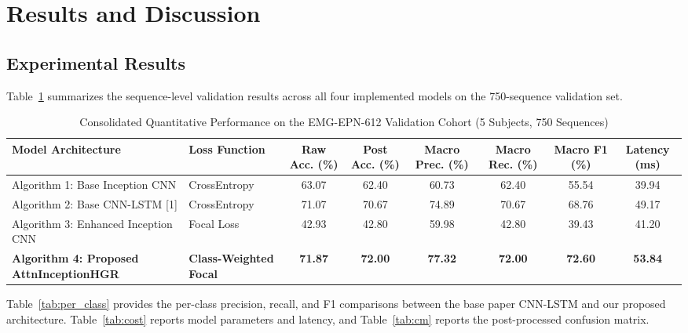 \documentclass[conference]{IEEEtran}
\begin{document}
\section{Results and Discussion}

\subsection{Experimental Results}
Table~\ref{tab:results} summarizes the sequence-level validation results across all four implemented models on the 750-sequence validation set.

\begin{table}[t]
\centering
\caption{Consolidated Quantitative Performance on the EMG-EPN-612 Validation Cohort (5 Subjects, 750 Sequences)}
\label{tab:results}
\begin{tabular}{llcccccc}
\toprule
\textbf{Model Architecture} & \textbf{Loss Function} & \textbf{Raw Acc. (\%)} & \textbf{Post Acc. (\%)} & \textbf{Macro Prec. (\%)} & \textbf{Macro Rec. (\%)} & \textbf{Macro F1 (\%)} & \textbf{Latency (ms)} \\
\midrule
Algorithm 1: Base Inception CNN & CrossEntropy & 63.07 & 62.40 & 60.73 & 62.40 & 55.54 & 39.94 \\
Algorithm 2: Base CNN-LSTM [1] & CrossEntropy & 71.07 & 70.67 & 74.89 & 70.67 & 68.76 & 49.17 \\
Algorithm 3: Enhanced Inception CNN & Focal Loss & 42.93 & 42.80 & 59.98 & 42.80 & 39.43 & 41.20 \\
\textbf{Algorithm 4: Proposed AttnInceptionHGR} & \textbf{Class-Weighted Focal} & \textbf{71.87} & \textbf{72.00} & \textbf{77.32} & \textbf{72.00} & \textbf{72.60} & \textbf{53.84} \\
\bottomrule
\end{tabular}
\end{table}

Table~\ref{tab:per_class} provides the per-class precision, recall, and F1 comparisons between the base paper CNN-LSTM and our proposed architecture. Table~\ref{tab:cost} reports model parameters and latency, and Table~\ref{tab:cm} reports the post-processed confusion matrix.
\end{document}
